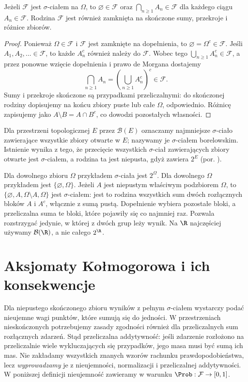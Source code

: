 \begin{stwierdzenie}
Jeżeli $\mathcal F$ jest $\sigma$-ciałem na $\Omega$, to
$\varnothing\in\mathcal F$ oraz $\bigcap_{n\geq1}A_n\in\mathcal F$
dla każdego ciągu $A_n\in\mathcal F$. Rodzina $\mathcal F$ jest
również zamknięta na skończone sumy, przekroje i różnice zbiorów.
\end{stwierdzenie}
\begin{proof}
Ponieważ $\Omega\in\mathcal F$ i $\mathcal F$ jest zamknięte
na dopełnienia, to $\varnothing=\Omega^c\in\mathcal F$.
Jeśli $A_1,A_2,\ldots\in\mathcal F$, to każde
$A_n^c$ również należy do $\mathcal F$. Wobec tego
$\bigcup_{n\geq1}A_n^c\in\mathcal F$, a przez ponowne
wzięcie dopełnienia i prawo de Morgana dostajemy
\[
\bigcap_{n\geq1}A_n
=\left(\bigcup_{n\geq1}A_n^c\right)^c\in\mathcal F.
\]
Sumy i przekroje skończone są przypadkami przeliczalnymi:
do skończonej rodziny dopisujemy na końcu zbiory puste
lub całe $\Omega$, odpowiednio. Różnicę zapisujemy jako
$A\setminus B=A\cap B^c$, co dowodzi pozostałych własności.
\end{proof}

\begin{definicja}
Dla przestrzeni topologicznej $E$ przez $\mathcal B(E)$ oznaczamy
najmniejsze $\sigma$-ciało zawierające wszystkie zbiory otwarte w $E$;
nazywamy je $\sigma$-ciałem borelowskim. Istnienie wynika z tego,
że przecięcie wszystkich $\sigma$-ciał zawierających zbiory
otwarte jest $\sigma$-ciałem, a rodzina ta jest niepusta,
gdyż zawiera $2^E$ (por.
).
\end{definicja}

\begin{przyklad}
Dla dowolnego zbioru $\Omega$ przykładem $\sigma$-ciała jest $2^\Omega$.
Dla dowolnego $\Omega$ przykładem jest $\{\varnothing,\Omega\}$.
Jeżeli $A$ jest niepustym właściwym podzbiorem $\Omega$, to
$\{\varnothing,A,\Omega\setminus A,\Omega\}$ jest $\sigma$-ciałem:
jest to rodzina wszystkich sum dwóch rozłącznych bloków
$A$ i $A^c$, włącznie z sumą pustą. Dopełnienie wybiera
pozostałe bloki, a przeliczalna suma te bloki, które pojawiły
się co najmniej raz. Pozwala rozstrzygać jedynie, w której
z dwóch grup leży wynik.
Na $\R$ najczęściej używamy $\mathcal B(\R)$, a nie całego $2^\R$.
\end{przyklad}

\section{Aksjomaty Kołmogorowa i ich konsekwencje}
Dla niepustego skończonego zbioru wyników z pełnym $\sigma$-ciałem
wystarczy podać nieujemne wagi punktów, które sumują się do jedności. W przestrzeniach nieskończonych
potrzebujemy zasady zgodności również dla przeliczalnych sum
rozłącznych zdarzeń. Stąd przeliczalna addytywność: jeśli zdarzenie
rozłożono na przeliczalnie wiele wykluczających się przypadków,
jego masa musi być sumą ich mas. Nie zakładamy wszystkich znanych
wzorów rachunku prawdopodobieństwa, lecz \emph{wyprowadzamy} je
z nieujemności, normalizacji i przeliczalnej addytywności.
W poniższej definicji nieujemność zawieramy w warunku
$\Prob:\mathcal F\to[0,1]$.

